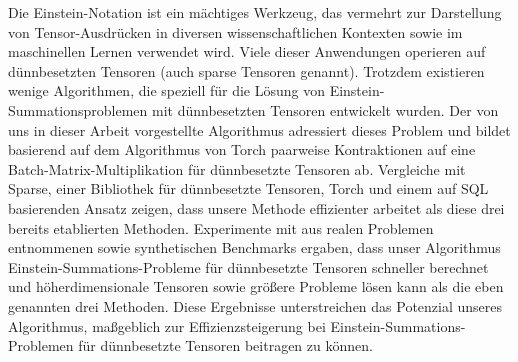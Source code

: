 Die Einstein-Notation ist ein mächtiges Werkzeug, das vermehrt zur Darstellung von Tensor-Ausdrücken
in diversen wissenschaftlichen Kontexten sowie im maschinellen Lernen verwendet wird. Viele dieser
Anwendungen operieren auf dünnbesetzten Tensoren (auch sparse Tensoren genannt). Trotzdem existieren wenige
Algorithmen, die speziell für die Lösung von Einstein-Summationsproblemen mit dünnbesetzten Tensoren
entwickelt wurden. Der von uns in dieser Arbeit vorgestellte Algorithmus adressiert dieses Problem und
bildet basierend auf dem Algorithmus von Torch paarweise Kontraktionen auf eine Batch-Matrix-Multiplikation
für dünnbesetzte Tensoren ab. Vergleiche mit Sparse, einer Bibliothek für dünnbesetzte Tensoren, Torch und
einem auf SQL basierenden Ansatz zeigen, dass unsere Methode effizienter arbeitet als diese drei bereits
etablierten Methoden. Experimente mit aus realen Problemen entnommenen sowie synthetischen Benchmarks
ergaben, dass unser Algorithmus Einstein-Summations-Probleme für dünnbesetzte Tensoren schneller berechnet
und höherdimensionale Tensoren sowie größere Probleme lösen kann als die eben genannten drei Methoden.
Diese Ergebnisse unterstreichen das Potenzial unseres Algorithmus, maßgeblich zur Effizienzsteigerung
bei Einstein-Summations-Problemen für dünnbesetzte Tensoren beitragen zu können.